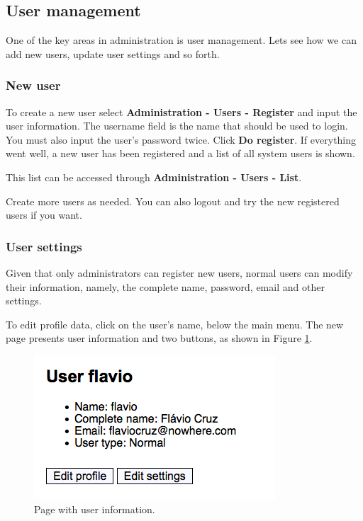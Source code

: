\subsection{User management}

One of the key areas in administration is user management.
Lets see how we can add new users, update user settings and so forth.

\subsubsection{New user}

To create a new user select \textbf{Administration - Users - Register} and input the user information.
The username field is the name that should be used to login. You must also input the
user's password twice. Click \textbf{Do register}. If everything went well,
a new user has been registered and a list of all system users is shown.

This list can be accessed through \textbf{Administration - Users - List}.

Create more users as needed. You can also logout and try the new registered users if you want.

\subsubsection{User settings}

Given that only administrators can register new users, normal users can modify their information,
namely, the complete name, password, email and other settings.

To edit profile data, click on the user's name, below the main menu. The new page
presents user information and two buttons, as shown in Figure \ref{fig:settings}.

\begin{figure}[H]
  \centering
    \includegraphics[scale=0.6]{settings.png}
  \caption{Page with user information.}
  \label{fig:settings}
\end{figure}

